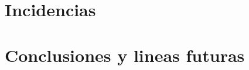 \documentclass{memoriaPFC}
\begin{document}
\chapter{Incidencias}



\chapter{Conclusiones y lineas futuras}



\backmatter
\appendix

%

\end{document}
